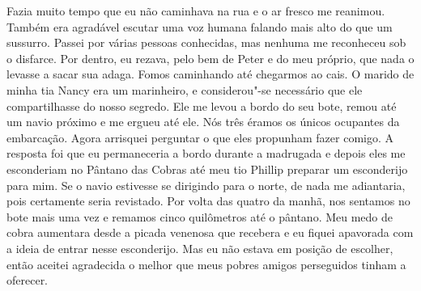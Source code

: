 Fazia muito tempo que eu não caminhava
na rua e o ar fresco me reanimou. Também era agradável escutar uma voz
humana falando mais alto do que um sussurro. Passei por várias pessoas
conhecidas, mas nenhuma me reconheceu sob o disfarce. Por dentro, eu
rezava, pelo bem de Peter e do meu próprio, que nada o levasse a sacar
sua adaga. Fomos caminhando até chegarmos ao cais. O marido de minha tia
Nancy era um marinheiro, e considerou"-se necessário que ele
compartilhasse do nosso segredo. Ele me levou a bordo do seu bote, remou
até um navio próximo e me ergueu até ele. Nós três éramos os únicos
ocupantes da embarcação. Agora arrisquei perguntar o que eles propunham
fazer comigo. A resposta foi que eu permaneceria a bordo durante a
madrugada e depois eles me esconderiam no Pântano das Cobras até meu tio
Phillip preparar um esconderijo para mim. Se o navio estivesse se
dirigindo para o norte, de nada me adiantaria, pois certamente seria
revistado. Por volta das quatro da manhã, nos sentamos no bote mais uma
vez e remamos cinco quilômetros até o pântano. Meu medo de cobra
aumentara desde a picada venenosa que recebera e eu fiquei apavorada com
a ideia de entrar nesse esconderijo. Mas eu não estava em posição de
escolher, então aceitei agradecida o melhor que meus pobres amigos
perseguidos tinham a oferecer.

